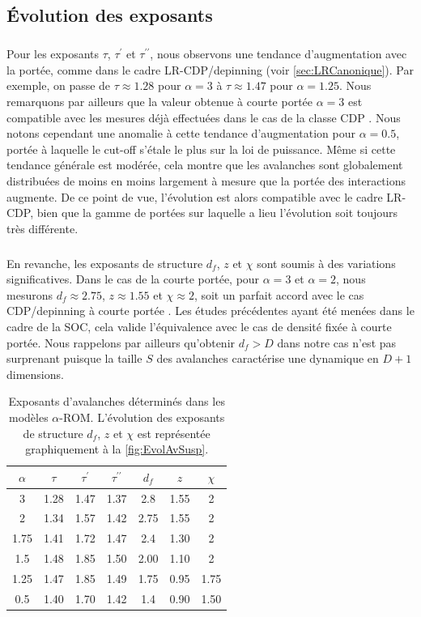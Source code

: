 \subsection{Évolution des exposants}

\subparagraph{}Pour les exposants $\tau$, $\tau^\prime$ et $\tau^{\prime\prime}$, nous observons une tendance d'augmentation avec la portée, comme dans le cadre LR-CDP/depinning (voir \autoref{sec:LRCanonique}). Par exemple, on passe de $\tau\approx 1.28$ pour $\alpha=3$ à $\tau\approx 1.47$ pour $\alpha=1.25$. Nous remarquons par ailleurs que la valeur obtenue à courte portée $\alpha = 3$ est compatible avec les mesures déjà effectuées dans le cas de la classe CDP  \cite{chessa_critical_1999}. Nous notons cependant une anomalie à cette tendance d'augmentation pour $\alpha=0.5$, portée à laquelle le cut-off s'étale le plus sur la loi de puissance. Même si cette tendance générale est modérée, cela montre que les avalanches sont globalement distribuées de moins en moins largement à mesure que la portée des interactions augmente. De ce point de vue, l'évolution est alors compatible avec le cadre LR-CDP, bien que la gamme de portées sur laquelle a lieu l'évolution soit toujours très différente.

\subparagraph{}En revanche, les exposants de structure $d_f$, $z$ et $\chi$ sont soumis à des variations significatives. Dans le cas de la courte portée, pour $\alpha=3$ et $\alpha=2$, nous mesurons $d_f \approx 2.75$, $z\approx 1.55$ et $\chi\approx 2$, soit un parfait accord avec le cas CDP/depinning à courte portée \cite{chessa_universality_1999, lubeck_universal_2004, chessa_critical_1999, wiese_theory_2022, rosso_depinning_2003}. Les études précédentes ayant été menées dans le cadre de la SOC, cela valide l'équivalence avec le cas de densité fixée à courte portée. Nous rappelons par ailleurs qu'obtenir $d_f>D$ dans notre cas n'est pas surprenant puisque la taille $S$ des avalanches caractérise une dynamique en $D+1$ dimensions. 

\begin{table}[h]
\centering
\begin{tabular}{ccccccc}
\hline \hline $\alpha$ & $\tau$ & \multicolumn{1}{c}{$\tau^\prime$} & $\tau^{\prime\prime}$ & $d_f$ & $z$ & $\chi$ \\
\hline 3 & 1.28 & 1.47 & 1.37 & 2.8 & 1.55 & 2 \\
2 & 1.34 & 1.57 & 1.42 & 2.75 & 1.55 & 2 \\
1.75 & 1.41 & 1.72 & 1.47 & 2.4 & 1.30 & 2 \\
1.5 & 1.48 & 1.85 & 1.50 & 2.00 & 1.10 & 2 \\
1.25 & 1.47 & 1.85 & 1.49 & 1.75 & 0.95 & 1.75 \\
0.5 & 1.40 & 1.70 & 1.42 & 1.4 & 0.90 & 1.50\\
\hline \hline
\end{tabular}
\caption{Exposants d'avalanches déterminés dans les modèles $\alpha$-ROM. L'évolution des exposants de structure $d_f$, $z$ et $\chi$ est représentée graphiquement à la \autoref{fig:EvolAvSusp}.}
\label{tab:expocritavsusp}
\end{table}


